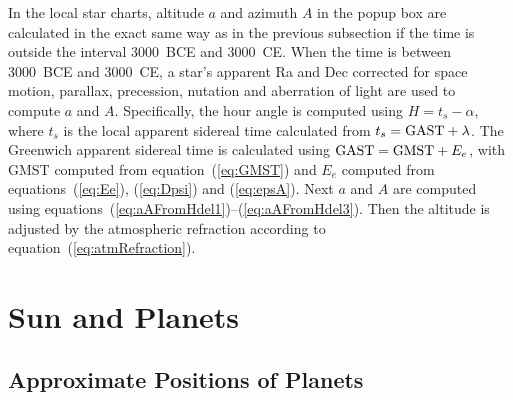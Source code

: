 \documentclass[12pt]{article}
\begin{document}
In the local star charts, altitude $a$ and azimuth $A$ in the popup box are 
calculated in the exact same way as in the previous subsection if the time 
is outside the interval 3000~BCE and 3000~CE. When the time is between 3000~BCE 
and 3000~CE, a star's apparent Ra and Dec corrected for space motion, parallax, 
precession, nutation and aberration of light are used to compute $a$ and $A$. 
Specifically, the hour angle is computed using $H=t_s-\alpha$, where $t_s$ 
is the local apparent sidereal time calculated from 
$t_s={\rm GAST}+\lambda$. The Greenwich apparent sidereal time is calculated 
using ${\rm GAST = GMST} + E_e$, with GMST computed from equation~(\ref{eq:GMST}) 
and $E_e$ computed from equations~(\ref{eq:Ee}), (\ref{eq:Dpsi}) and (\ref{eq:epsA}). 
Next $a$ and $A$ are computed using
equations~(\ref{eq:aAFromHdel1})--(\ref{eq:aAFromHdel3}). Then the altitude
is adjusted by the atmospheric refraction according to equation~(\ref{eq:atmRefraction}).

\section{Sun and Planets}

\subsection{Approximate Positions of Planets} 
\end{document}
